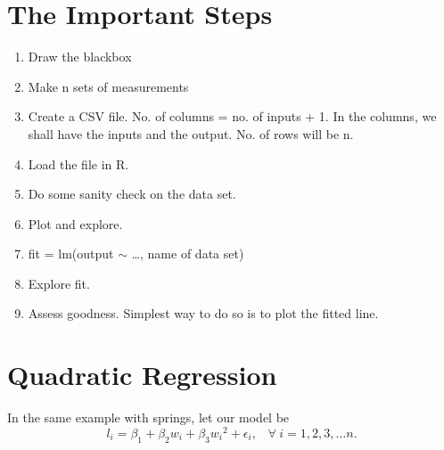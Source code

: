 \documentclass[11pt, a4paper]{article}\usepackage[]{graphicx}\usepackage[]{xcolor}
\begin{document}
\section*{The Important Steps}

\begin{enumerate}[(1)]

\item Draw the blackbox

\item Make n sets of measurements

\item Create a CSV file. No. of columns = no. of inputs + 1. In the columns, we shall have the inputs and the output. No. of rows will be n.

\item Load the file in R.

\item Do some sanity check on the data set.

\item Plot and explore.

\item fit = lm(output $\sim$ \ldots, name of data set)

\item Explore fit.

\item Assess goodness. Simplest way to do so is to plot the fitted line.
\end{enumerate}


\section*{Quadratic Regression}

In the same example with springs, let our model be \\

$$l_i = \beta_1 + \beta_2 w_i + \beta_3 {w_i}^2 + \epsilon_i, \hspace{10pt} \forall \hspace{3pt} i = 1, 2, 3, \ldots n.$$
\end{document}
